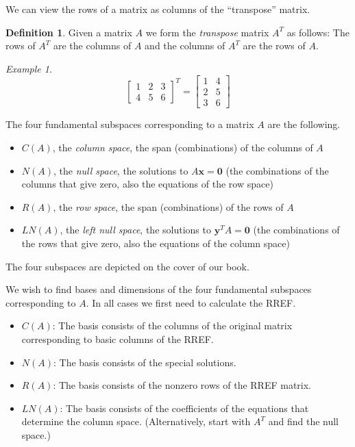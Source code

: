 \documentclass[11pt,oneside]{amsbook}
\theoremstyle{definition}
\theoremstyle{plain}
\theoremstyle{definition}
\newtheorem{definition}[theorem]{Definition}
\theoremstyle{remark}
\newtheorem{example}[theorem]{Example}
\numberwithin{equation}{section}
\numberwithin{figure}{section}
\begin{document}
We can view the rows of a matrix as columns of the ``transpose'' matrix.

\begin{definition}
  Given a matrix $A$ we form the \emph{transpose} matrix $A^T$ as follows: The rows of $A^T$ are the columns of $A$ and the columns of $A^T$ are the rows of $A$.
\end{definition}

\begin{example}
  \[\begin{bmatrix}1&2&3\\4&5&6\end{bmatrix}^T
    =\begin{bmatrix}1&4\\2&5\\3&6\end{bmatrix}
  \]
\end{example}

The four fundamental subspaces corresponding to a matrix $A$ are the following.
\begin{itemize}
  \item $C(A)$, the \emph{column space}, the span (combinations) of the columns of $A$
  \item $N(A)$, the \emph{null space}, the solutions to $A\mathbf{x}=\mathbf{0}$ (the combinations of the columns that give zero, also the equations of the row space)
  \item $R(A)$, the \emph{row space}, the span (combinations) of the rows of $A$
  \item $LN(A)$, the \emph{left null space}, the solutions to $\mathbf{y}^TA=\mathbf{0}$ (the combinations of the rows that give zero, also the equations of the column space)
\end{itemize}

The four subspaces are depicted on the cover of our book.

We wish to find bases and dimensions of the four fundamental subspaces corresponding to $A$. In all cases we first need to calculate the RREF.
\begin{itemize}
  \item $C(A)$: The basis consists of the columns of the original matrix corresponding to basic columns of the RREF.
  \item $N(A)$: The basis consists of the special solutions.
  \item $R(A)$: The basis consists of the nonzero rows of the RREF matrix.
  \item $LN(A)$: The basis consists of the coefficients of the equations that determine the column space. (Alternatively, start with $A^T$ and find the null space.)
\end{itemize}
\end{document}

